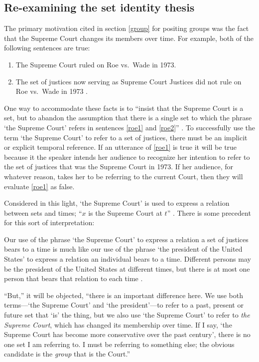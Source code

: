 \documentclass[11pt]{article}
\newenvironment{squote}{%
\begin{spacing}{1}
\begin{list}{}{%
\setlength{\labelwidth}{0pt}%
\rightmargin\leftmargin%
}
\item\relax
}{%
\end{list}%
\end{spacing}
}
\begin{document}
\begin{spacing}{1.5}
\section{Re-examining the set identity thesis}
\label{set-id}
The primary motivation cited in section \ref{group} for positing
groups was the fact that the Supreme Court changes its members over
time.  For example, both of the following sentences are true:

\begin{enumerate}[label=(\arabic*)]
  \item The Supreme Court ruled on Roe vs.\ Wade in 1973. \label{roe1}

  \item The set of justices now serving as Supreme Court Justices did
    not rule on Roe vs.\ Wade in 1973
    \citep[135]{uzquiano2004a}. \label{roe2}
\end{enumerate}

One way to accommodate these facts is to ``insist that the Supreme
Court is a set, but to abandon the assumption that there is a single
set to which the phrase `the Supreme Court' refers in sentences
\ref{roe1} and \ref{roe2}'' \citep[138]{uzquiano2004a}.  To
successfully use the term `the Supreme Court' to refer to a set of
justices, there must be an implicit or explicit temporal reference.
If an utterance of \ref{roe1} is true it will be true because it the
speaker intends her audience to recognize her intention to refer to
the set of justices that was the Supreme Court in 1973.  If her
audience, for whatever reason, takes her to be referring to the
current Court, then they will evaluate \ref{roe1} as false.

Considered in this light, `the Supreme Court' is used to express a
relation between sets and times; ``$x$ is the Supreme Court at $t$''
\citep[140]{uzquiano2004a}.  There is some precedent for this sort of
interpretation:

\begin{squote}
Our use of the phrase `the Supreme Court' to express a relation a set
of justices bears to a time is much like our use of the phrase `the
president of the United States' to express a relation an individual
bears to a time.  Different persons may be the president of the United
States at different times, but there is at most one person that bears
that relation to each time \citep[138]{uzquiano2004a}.
\end{squote}

``But,'' it will be objected, ``there is an important difference here.
We use both terms---`the Supreme Court' and `the president'---to refer
to a past, present or future set that `is' the thing, but we also use
`the Supreme Court' to refer to {\em the Supreme Court}, which has
changed its membership over time.  If I say, `the Supreme Court has
become more conservative over the past century', there is no one set I
am referring to.  I must be referring to something else; the obvious
candidate is the {\em group} that is the Court.''


\end{spacing}
\end{document}
